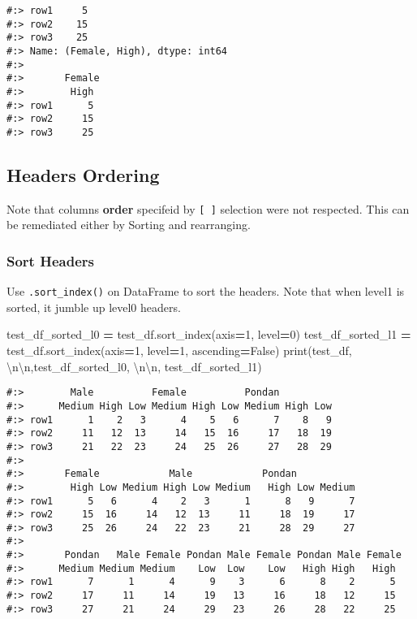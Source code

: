 \documentclass[
]{book}
\newenvironment{Shaded}{\begin{snugshade}}{\end{snugshade}}
\newcommand{\BuiltInTok}[1]{#1}
\newcommand{\CharTok}[1]{\textcolor[rgb]{0.5,0.5,0.5}{#1}}
\newcommand{\DecValTok}[1]{\textcolor[rgb]{0.06,0.06,0.06}{#1}}
\newcommand{\NormalTok}[1]{#1}
\newcommand{\OperatorTok}[1]{\textcolor[rgb]{0.43,0.43,0.43}{\textbf{#1}}}
\newcommand{\StringTok}[1]{\textcolor[rgb]{0.5,0.5,0.5}{#1}}
\newcommand{\VariableTok}[1]{\textcolor[rgb]{0,0,0}{#1}}
\begin{document}
\begin{verbatim}
#:> row1     5
#:> row2    15
#:> row3    25
#:> Name: (Female, High), dtype: int64 
#:> 
#:>       Female
#:>        High
#:> row1      5
#:> row2     15
#:> row3     25
\end{verbatim}

\hypertarget{headers-ordering}{%
\subsection{Headers Ordering}\label{headers-ordering}}

Note that columns \textbf{order} specifeid by \texttt{{[}\ {]}} selection were not respected. This can be remediated either by Sorting and rearranging.

\hypertarget{sort-headers}{%
\subsubsection{Sort Headers}\label{sort-headers}}

Use \texttt{.sort\_index()} on DataFrame to sort the headers. Note that when level1 is sorted, it jumble up level0 headers.

\begin{Shaded}
\begin{Highlighting}[]
\NormalTok{test\_df\_sorted\_l0 }\OperatorTok{=}\NormalTok{ test\_df.sort\_index(axis}\OperatorTok{=}\DecValTok{1}\NormalTok{, level}\OperatorTok{=}\DecValTok{0}\NormalTok{)}
\NormalTok{test\_df\_sorted\_l1 }\OperatorTok{=}\NormalTok{ test\_df.sort\_index(axis}\OperatorTok{=}\DecValTok{1}\NormalTok{, level}\OperatorTok{=}\DecValTok{1}\NormalTok{, ascending}\OperatorTok{=}\VariableTok{False}\NormalTok{)}
\BuiltInTok{print}\NormalTok{(test\_df, }\StringTok{\textquotesingle{}}\CharTok{\textbackslash{}n\textbackslash{}n}\StringTok{\textquotesingle{}}\NormalTok{,test\_df\_sorted\_l0, }\StringTok{\textquotesingle{}}\CharTok{\textbackslash{}n\textbackslash{}n}\StringTok{\textquotesingle{}}\NormalTok{, test\_df\_sorted\_l1)}
\end{Highlighting}
\end{Shaded}

\begin{verbatim}
#:>        Male          Female          Pondan         
#:>      Medium High Low Medium High Low Medium High Low
#:> row1      1    2   3      4    5   6      7    8   9
#:> row2     11   12  13     14   15  16     17   18  19
#:> row3     21   22  23     24   25  26     27   28  29 
#:> 
#:>       Female            Male            Pondan           
#:>        High Low Medium High Low Medium   High Low Medium
#:> row1      5   6      4    2   3      1      8   9      7
#:> row2     15  16     14   12  13     11     18  19     17
#:> row3     25  26     24   22  23     21     28  29     27 
#:> 
#:>       Pondan   Male Female Pondan Male Female Pondan Male Female
#:>      Medium Medium Medium    Low  Low    Low   High High   High
#:> row1      7      1      4      9    3      6      8    2      5
#:> row2     17     11     14     19   13     16     18   12     15
#:> row3     27     21     24     29   23     26     28   22     25
\end{verbatim}
\end{document}

